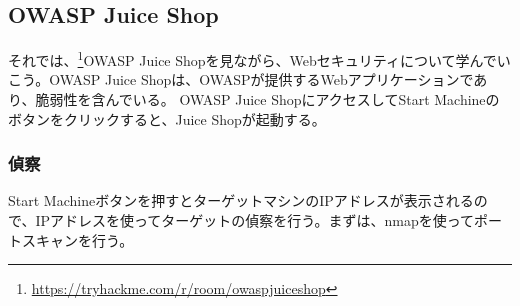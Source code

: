 \documentclass{jlreq}
\begin{document}
\subsection{OWASP Juice Shop}
それでは、\footnote{\url{https://tryhackme.com/r/room/owaspjuiceshop}}OWASP Juice Shopを見ながら、Webセキュリティについて学んでいこう。OWASP Juice Shopは、OWASPが提供するWebアプリケーションであり、脆弱性を含んでいる。
OWASP Juice ShopにアクセスしてStart Machineのボタンをクリックすると、Juice Shopが起動する。

\subsubsection{偵察}
Start Machineボタンを押すとターゲットマシンのIPアドレスが表示されるので、IPアドレスを使ってターゲットの偵察を行う。まずは、nmapを使ってポートスキャンを行う。
\end{document}
